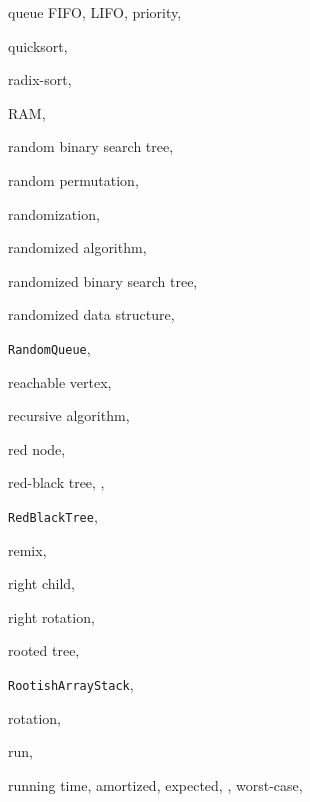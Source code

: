 \documentclass[10pt]{book}
\theoremstyle{plain}
\theoremstyle{definition}
\begin{document}
\begin{theindex}
  \indexspace

  \item queue
    \subitem FIFO, 
    \subitem LIFO, 
    \subitem priority, 
  \item quicksort, 

  \indexspace

  \item radix-sort, 
  \item RAM, 
  \item random binary search tree, 
  \item random permutation, 
  \item randomization, 
  \item randomized algorithm, 
  \item randomized binary search tree, 
  \item randomized data structure, 
  \item \texttt{RandomQueue}, 
  \item reachable vertex, 
  \item recursive algorithm, 
  \item red node, 
  \item red-black tree, , 
  \item \texttt{RedBlackTree}, 
  \item remix, 
  \item right child, 
  \item right rotation, 
  \item rooted tree, 
  \item \texttt{RootishArrayStack}, 
  \item rotation, 
  \item run, 
  \item running time, 
    \subitem amortized, 
    \subitem expected, , 
    \subitem worst-case, 

  \indexspace


\end{theindex}
\end{document}
